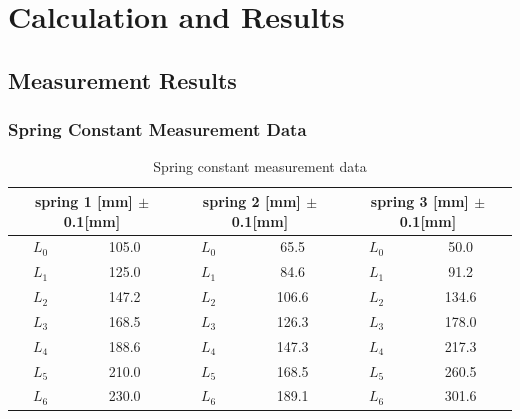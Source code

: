 \documentclass[12pt]{article}
\begin{document}
\section{Calculation and Results}
\subsection{Measurement Results}
\subsubsection{Spring Constant Measurement Data}
\begin{table}[H]
\centering
\begin{tabular}{|c|c|c|c|c|c|}
\hline
\multicolumn{2}{|c|}{spring 1 {[}mm{]} $\pm$ 0.1{[}mm{]}} & \multicolumn{2}{c|}{spring 2 {[}mm{]} $\pm$ 0.1{[}mm{]}} & \multicolumn{2}{c|}{spring 3 {[}mm{]} $\pm$ 0.1{[}mm{]}} \\ \hline
$L_0$                           & 105.0     &      $L_0$            & 65.5                 &    $L_0$              & 50.0                 \\ \hline
$L_1$                             & 125.0     &    $L_1$               & 84.6                 &   $L_1$                & 91.2                 \\ \hline
   $L_2$                           & 147.2     &      $L_2$             & 106.6                &    $L_2$               & 134.6                \\ \hline
    $L_3$                          & 168.5     &      $L_3$             & 126.3                &      $L_3$             & 178.0                \\ \hline
      $L_4$                        & 188.6     &       $L_4$           & 147.3                &       $L_4$           & 217.3                \\ \hline
     $L_5$                        & 210.0     &    $L_5$             & 168.5                &       $L_5$          & 260.5                \\ \hline
$L_6$     & 230.0     &      $L_6$             & 189.1                &   $L_6$   & 301.6                \\ \hline
\end{tabular}
\caption{Spring constant measurement data}
\end{table}
\end{document}
